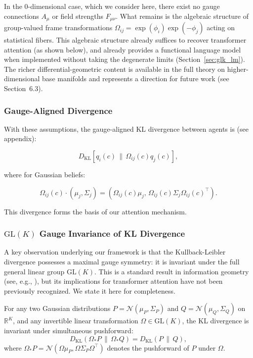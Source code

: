 \documentclass[twoside,11pt]{article}
\begin{document}
In the 0-dimensional case, which we consider here, there exist no gauge connections $A_\mu$ or field strengths $F_{\mu\nu}$. What remains is the algebraic structure of group-valued frame transformations $\Omega_{ij} = \exp(\phi_i)\exp(-\phi_j)$ acting on statistical fibers. This algebraic structure already suffices to recover transformer attention (as shown below), and already provides a functional language model when implemented without taking the degenerate limits (Section~\ref{sec:glk_lm}). The richer differential-geometric content is available in the full theory on higher-dimensional base manifolds and represents a direction for future work (see Section~6.3).


\subsubsection{Gauge-Aligned Divergence}
With these assumptions, the gauge-aligned KL divergence between agents is (see appendix):

\begin{equation}
D_{\text{KL}}\left[q_i(c) \,\big\|\, \Omega_{ij}(c) q_j(c)\right],
\end{equation}

where for Gaussian beliefs:

\begin{equation}
\Omega_{ij}(c) \cdot (\mu_j, \Sigma_j) = \left(\Omega_{ij}(c)\mu_j, \, \Omega_{ij}(c)\Sigma_j\Omega_{ij}(c)^\top\right).
\end{equation}

This divergence forms the basis of our attention mechanism.

\subsubsection{$\mathrm{GL}(K)$ Gauge Invariance of KL Divergence}
\label{sec:glk_invariance}

A key observation underlying our framework is that the Kullback-Leibler divergence possesses a maximal gauge symmetry: it is invariant under the full general linear group $\mathrm{GL}(K)$. This is a standard result in information geometry (see, e.g., \citet{amari2016information}), but its implications for transformer attention have not been previously recognized. We state it here for completeness.

\begin{theorem}
\label{thm:glk_invariance}
For any two Gaussian distributions $P = \mathcal{N}(\mu_P, \Sigma_P)$ and $Q = \mathcal{N}(\mu_Q, \Sigma_Q)$ on $\mathbb{R}^K$, and any invertible linear transformation $\Omega \in \mathrm{GL}(K)$, the KL divergence is invariant under simultaneous pushforward:
\begin{equation}
D_{\mathrm{KL}}(\Omega_* P \,\|\, \Omega_* Q) = D_{\mathrm{KL}}(P \,\|\, Q),
\label{eq:glk_invariance}
\end{equation}
where $\Omega_* P = \mathcal{N}(\Omega\mu_P, \Omega\Sigma_P\Omega^\top)$ denotes the pushforward of $P$ under $\Omega$.
\end{theorem}
\end{document}
